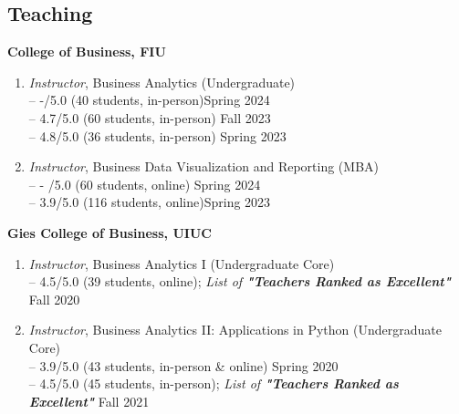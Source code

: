 \documentclass[margin,line]{resume}
\begin{document}
\begin{resume}
	  
 	  \section{\mysidestyle Teaching} 
 	  \textbf{College of Business, FIU}
 	    \begin{enumerate}[topsep=1pt, leftmargin=*]
         \item {\sl Instructor}, Business Analytics (Undergraduate)\\
         -- -/5.0 (40 students, in-person)\hfill Spring 2024\\
         -- 4.7/5.0 (60 students, in-person) \hfill Fall 2023\\
         -- 4.8/5.0 (36 students, in-person) \hfill Spring 2023
         \item {\sl Instructor}, Business Data Visualization and Reporting (MBA)\\
         -- - /5.0 (60 students, online) \hfill Spring 2024\\
         -- 3.9/5.0 (116 students, online)\hfill Spring 2023
         \end{enumerate}
 	  
         \textbf{Gies College of Business, UIUC}
         \begin{enumerate}[topsep=1pt, leftmargin=*]
         \item {\sl Instructor}, Business Analytics I (Undergraduate Core)\\ [0.3em]
         -- 4.5/5.0 (39 students, online); \textit{List of \textbf{"Teachers Ranked as Excellent"} } \hfill Fall 2020
         \item {\sl Instructor}, Business Analytics II: Applications in Python (Undergraduate Core)\\[0.3em]
         -- 3.9/5.0 (43 students, in-person \& online)  \hfill Spring 2020\\
         -- 4.5/5.0 (45 students, in-person); \textit{List of \textbf{"Teachers Ranked as Excellent"} } \hfill Fall 2021
         \end{enumerate}


\end{resume}
\end{document}
